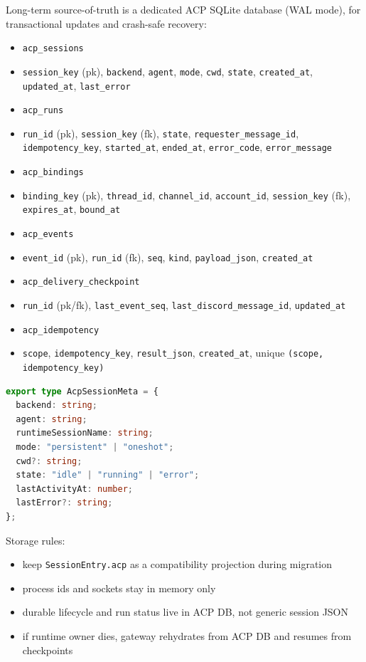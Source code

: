 Long-term source-of-truth is a dedicated ACP SQLite database (WAL mode), for transactional updates and crash-safe recovery:

\begin{itemize}
  \item \texttt{acp\_sessions}
  \item \texttt{session\_key} (pk), \texttt{backend}, \texttt{agent}, \texttt{mode}, \texttt{cwd}, \texttt{state}, \texttt{created\_at}, \texttt{updated\_at}, \texttt{last\_error}
  \item \texttt{acp\_runs}
  \item \texttt{run\_id} (pk), \texttt{session\_key} (fk), \texttt{state}, \texttt{requester\_message\_id}, \texttt{idempotency\_key}, \texttt{started\_at}, \texttt{ended\_at}, \texttt{error\_code}, \texttt{error\_message}
  \item \texttt{acp\_bindings}
  \item \texttt{binding\_key} (pk), \texttt{thread\_id}, \texttt{channel\_id}, \texttt{account\_id}, \texttt{session\_key} (fk), \texttt{expires\_at}, \texttt{bound\_at}
  \item \texttt{acp\_events}
  \item \texttt{event\_id} (pk), \texttt{run\_id} (fk), \texttt{seq}, \texttt{kind}, \texttt{payload\_json}, \texttt{created\_at}
  \item \texttt{acp\_delivery\_checkpoint}
  \item \texttt{run\_id} (pk/fk), \texttt{last\_event\_seq}, \texttt{last\_discord\_message\_id}, \texttt{updated\_at}
  \item \texttt{acp\_idempotency}
  \item \texttt{scope}, \texttt{idempotency\_key}, \texttt{result\_json}, \texttt{created\_at}, unique \texttt{(scope, idempotency\_key)}
\end{itemize}


\begin{lstlisting}[language=typescript]
export type AcpSessionMeta = {
  backend: string;
  agent: string;
  runtimeSessionName: string;
  mode: "persistent" | "oneshot";
  cwd?: string;
  state: "idle" | "running" | "error";
  lastActivityAt: number;
  lastError?: string;
};
\end{lstlisting}


Storage rules:

\begin{itemize}
  \item keep \texttt{SessionEntry.acp} as a compatibility projection during migration
  \item process ids and sockets stay in memory only
  \item durable lifecycle and run status live in ACP DB, not generic session JSON
  \item if runtime owner dies, gateway rehydrates from ACP DB and resumes from checkpoints
\end{itemize}


